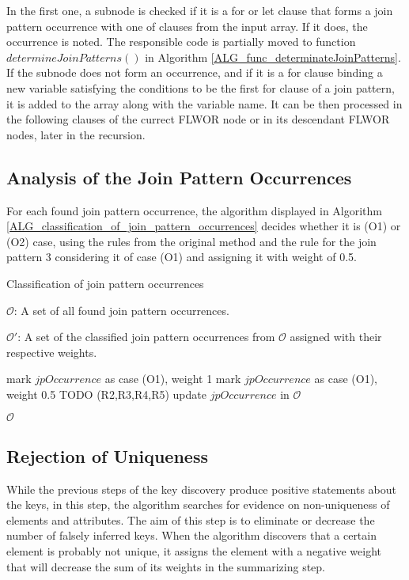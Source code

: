 In the first one, a subnode is checked if it is a for or let clause that forms a join pattern occurrence with one of clauses from the input array. If it does, the occurrence is noted. The responsible code is partially moved to function $determineJoinPatterns()$ in Algorithm \ref{ALG_func_determinateJoinPatterns}. If the subnode does not form an occurrence, and if it is a for clause binding a new variable satisfying the conditions to be the first for clause of a join pattern, it is added to the array along with the variable name. It can be then processed in the following clauses of the currect FLWOR node or in its descendant FLWOR nodes, later in the recursion.

\subsection{Analysis of the Join Pattern Occurrences}
For each found join pattern occurrence, the algorithm displayed in Algorithm \ref{ALG_classification_of_join_pattern_occurrences} decides whether it is (O1) or (O2) case, using the rules from the original method and the rule for the join pattern 3 considering it of case (O1) and assigning it with weight of 0.5.

\begin{algorithm}
\caption{Classification of join pattern occurrences}
\label{ALG_classification_of_join_pattern_occurrences}
\begin{algorithmic}[1]
\REQUIRE $\mathcal{O}$: A set of all found join pattern occurrences.

\ENSURE $\mathcal{O'}$: A set of the classified join pattern occurrences from $\mathcal{O}$ assigned with their respective weights.

        \STATE mark $jpOccurrence$ as case (O1), weight 1
        \STATE mark $jpOccurrence$ as case (O1), weight 0.5
    \ELSE
        \STATE TODO (R2,R3,R4,R5)
    \ENDIF
    \STATE update $jpOccurrence$ in $\mathcal{O}$
\ENDFOR

\RETURN $\mathcal{O}$
\end{algorithmic}
\end{algorithm}

\subsection{Rejection of Uniqueness}
While the previous steps of the key discovery produce positive statements about the keys, in this step, the algorithm searches for evidence on non-uniqueness of elements and attributes. The aim of this step is to eliminate or decrease the number of falsely inferred keys.
When the algorithm discovers that a certain element is probably not unique, it assigns the element with a negative weight that will decrease the sum of its weights in the summarizing step.

